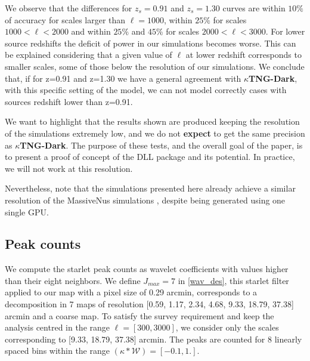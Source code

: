 \documentclass{aa}
\begin{document}
We observe that the differences for $z_s=0.91$ and  $z_s=1.30$ curves are within $10\%$ of accuracy for scales larger than $\ell=1000$, within $25\%$  for scales $1000<\ell<2000$ and  within $25\%$ and $45\%$ for scales $2000<\ell<3000$. For lower source redshifts the deficit of power in our simulations becomes worse. This can be explained considering that a given value of $\ell$ at lower redshift corresponds to smaller scales, some of those below the resolution of our simulations. We conclude that, if for z=0.91 and z=1.30 we have a general agreement with \textbf{$\kappa$TNG-Dark}, with this specific setting of the model, we can not model correctly cases with sources redshift lower than z=0.91.


 We want to highlight that the results shown are produced keeping the resolution of the simulations extremely low, and we do not \textbf{expect} to get the same precision as \textbf{$\kappa$TNG-Dark}. The purpose of these tests, and the overall goal of the paper, is to present a proof of concept of the DLL package and its potential.  In practice, we will not work at this resolution. 

Nevertheless, note that the simulations presented here already achieve a similar resolution of the MassiveNus simulations \citep{liu2018massivenus}, despite being generated using one single GPU. 


\subsection{Peak counts}\label{peak_sec}
We compute the starlet peak counts as wavelet coefficients with values higher than their eight neighbors. 
We define $J_{max}=7$ in \autoref{wav_des}, this starlet filter applied to our map with a pixel size of 0.29 arcmin, corresponds to a decomposition in 7 maps of resolution [0.59, 1.17, 2.34, 4.68, 9.33, 18.79, 37.38] arcmin and a coarse map. To satisfy the survey requirement and keep the analysis centred in the range $\ell=[300, 3000]$, we consider only the scales corresponding to [9.33, 18.79, 37.38] arcmin. The peaks are counted for 8 linearly spaced bins within the range $(\kappa*\mathcal{W})=[-0.1, 1.]$. 
\end{document}
